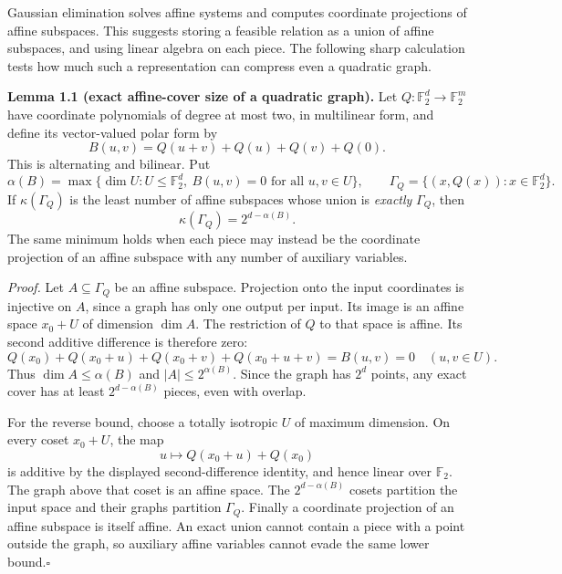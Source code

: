 \documentclass[11pt]{article}
\newcommand{\F}{\mathbb{F}}
\begin{document}
Gaussian elimination solves affine systems and computes coordinate projections
of affine subspaces. This suggests storing a feasible relation as a union of
affine subspaces, and using linear algebra on each piece. The following sharp
calculation tests how much such a representation can compress even a quadratic
graph.

\medskip
\textbf{Lemma 1.1 (exact affine-cover size of a quadratic graph).}
Let $Q:\F_2^d\to\F_2^m$ have coordinate polynomials of degree at most two, in
multilinear form, and define its vector-valued polar form by
\[
 B(u,v)=Q(u+v)+Q(u)+Q(v)+Q(0).
\]
This is alternating and bilinear. Put
\[
 \alpha(B)=\max\{\dim U:U\le\F_2^d,\ B(u,v)=0\text{ for all }u,v\in U\},
 \qquad \Gamma_Q=\{(x,Q(x)):x\in\F_2^d\}.
\]
If $\kappa(\Gamma_Q)$ is the least number of affine subspaces whose union is
\emph{exactly} $\Gamma_Q$, then
\begin{equation}\label{ra:1:cover}
             \kappa(\Gamma_Q)=2^{d-\alpha(B)}.
\end{equation}
The same minimum holds when each piece may instead be the coordinate
projection of an affine subspace with any number of auxiliary variables.

\emph{Proof.}
Let $A\subseteq\Gamma_Q$ be an affine subspace. Projection onto the input
coordinates is injective on $A$, since a graph has only one output per input.
Its image is an affine space $x_0+U$ of dimension $\dim A$. The restriction of
$Q$ to that space is affine. Its second additive difference is therefore zero:
\[
 Q(x_0)+Q(x_0+u)+Q(x_0+v)+Q(x_0+u+v)=B(u,v)=0
 \quad(u,v\in U).
\]
Thus $\dim A\le\alpha(B)$ and $|A|\le2^{\alpha(B)}$. Since the graph has $2^d$
points, any exact cover has at least $2^{d-\alpha(B)}$ pieces, even with overlap.

For the reverse bound, choose a totally isotropic $U$ of maximum dimension.
On every coset $x_0+U$, the map
\[
 u\longmapsto Q(x_0+u)+Q(x_0)
\]
is additive by the displayed second-difference identity, and hence linear over
$\F_2$. The graph above that coset is an affine space. The $2^{d-\alpha(B)}$
cosets partition the input space and their graphs partition $\Gamma_Q$.
Finally a coordinate projection of an affine subspace is itself affine.
An exact union cannot contain a piece with a point outside the graph, so
auxiliary affine variables cannot evade the same lower bound.\hfill$\square$
\end{document}
